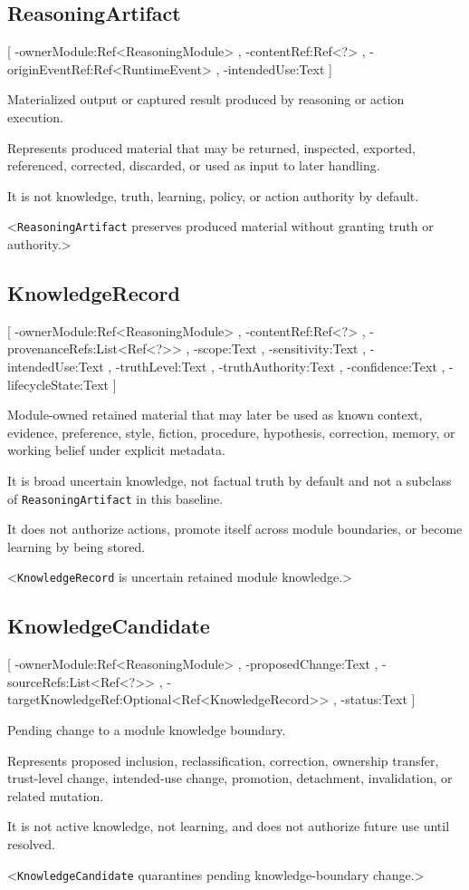 \subsection{ReasoningArtifact}
[
	\UMLAt-ownerModule:Ref<ReasoningModule> ,
	\UMLAt-contentRef:Ref<?> ,
	\UMLAt-originEventRef:Ref<RuntimeEvent> ,
	\UMLAt-intendedUse:Text
]{%
	\item[] Materialized output or captured result produced by reasoning or action execution.
	\item[] Represents produced material that may be returned, inspected, exported, referenced, corrected, discarded, or used as input to later handling.
	\item[] It is not knowledge, truth, learning, policy, or action authority by default.
}<\texttt{ReasoningArtifact} preserves produced material without granting truth or authority.>

\subsection{KnowledgeRecord}
[
	\UMLAt-ownerModule:Ref<ReasoningModule> ,
	\UMLAt-contentRef:Ref<?> ,
	\UMLAt-provenanceRefs:List<Ref<?>> ,
	\UMLAt-scope:Text ,
	\UMLAt-sensitivity:Text ,
	\UMLAt-intendedUse:Text ,
	\UMLAt-truthLevel:Text ,
	\UMLAt-truthAuthority:Text ,
	\UMLAt-confidence:Text ,
	\UMLAt-lifecycleState:Text
]{%
	\item[] Module-owned retained material that may later be used as known context, evidence, preference, style, fiction, procedure, hypothesis, correction, memory, or working belief under explicit metadata.
	\item[] It is broad uncertain knowledge, not factual truth by default and not a subclass of \texttt{ReasoningArtifact} in this baseline.
	\item[] It does not authorize actions, promote itself across module boundaries, or become learning by being stored.
}<\texttt{KnowledgeRecord} is uncertain retained module knowledge.>

\subsection{KnowledgeCandidate}
[
	\UMLAt-ownerModule:Ref<ReasoningModule> ,
	\UMLAt-proposedChange:Text ,
	\UMLAt-sourceRefs:List<Ref<?>> ,
	\UMLAt-targetKnowledgeRef:Optional<Ref<KnowledgeRecord>> ,
	\UMLAt-status:Text
]{%
	\item[] Pending change to a module knowledge boundary.
	\item[] Represents proposed inclusion, reclassification, correction, ownership transfer, trust-level change, intended-use change, promotion, detachment, invalidation, or related mutation.
	\item[] It is not active knowledge, not learning, and does not authorize future use until resolved.
}<\texttt{KnowledgeCandidate} quarantines pending knowledge-boundary change.>

